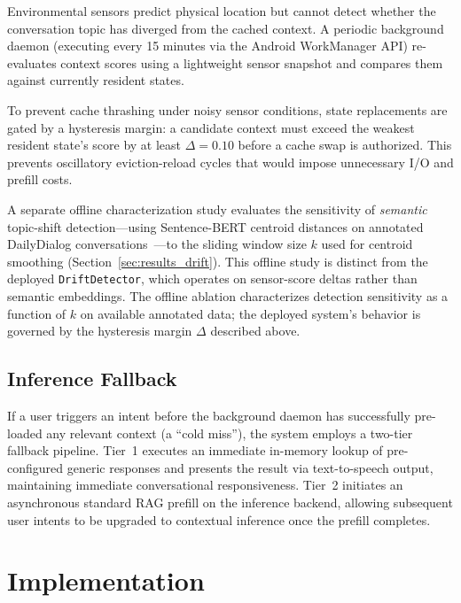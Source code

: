 \documentclass[journal]{IEEEtran}
\begin{document}
Environmental sensors predict physical location but cannot detect whether the conversation topic has diverged from the cached context. A periodic background daemon (executing every 15 minutes via the Android WorkManager API) re-evaluates context scores using a lightweight sensor snapshot and compares them against currently resident states.

To prevent cache thrashing under noisy sensor conditions, state replacements are gated by a hysteresis margin: a candidate context must exceed the weakest resident state's score by at least $\Delta = 0.10$ before a cache swap is authorized. This prevents oscillatory eviction-reload cycles that would impose unnecessary I/O and prefill costs.

A separate offline characterization study evaluates the sensitivity of \emph{semantic} topic-shift detection---using Sentence-BERT centroid distances on annotated DailyDialog conversations~\cite{dailydialog}---to the sliding window size $k$ used for centroid smoothing (Section~\ref{sec:results_drift}). This offline study is distinct from the deployed \texttt{DriftDetector}, which operates on sensor-score deltas rather than semantic embeddings. The offline ablation characterizes detection sensitivity as a function of $k$ on available annotated data; the deployed system's behavior is governed by the hysteresis margin $\Delta$ described above.

\subsection{Inference Fallback}
\label{sec:fallback}

If a user triggers an intent before the background daemon has successfully pre-loaded any relevant context (a ``cold miss''), the system employs a two-tier fallback pipeline. Tier~1 executes an immediate in-memory lookup of pre-configured generic responses and presents the result via text-to-speech output, maintaining immediate conversational responsiveness. Tier~2 initiates an asynchronous standard RAG prefill on the inference backend, allowing subsequent user intents to be upgraded to contextual inference once the prefill completes.

\section{Implementation}
\label{sec:implementation}
\end{document}

